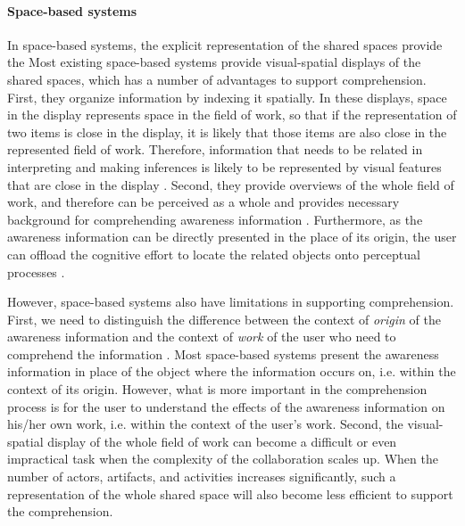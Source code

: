 \paragraph*{Space-based systems} %
\label{par:space_based_systems}
In space-based systems, the explicit representation of the shared spaces provide the Most existing space-based systems provide visual-spatial displays \cite{Hegarty2011} of the shared spaces, which has a number of advantages to support comprehension. First, they organize information by indexing it spatially. In these displays, space in the display represents space in the field of work, so that if the representation of two items is close in the display, it is likely that those items are also close in the represented field of work. Therefore, information that needs to be related in interpreting and making inferences is likely to be represented by visual features that are close in the display \cite{Hegarty2011}. Second, they provide overviews of the whole field of work, and therefore can be perceived as a whole and provides necessary background for comprehending awareness information \cite{Berlage1999}. Furthermore, as the awareness information can be directly presented in the place of its origin, the user can offload the cognitive effort to locate the related objects onto perceptual processes \cite{M.1996}.

However, space-based systems also have limitations in supporting comprehension. First, we need to distinguish the difference between the context of \emph{origin} of the awareness information and the context of \emph{work} of the user who need to comprehend the information \cite{Gross2004}. Most space-based systems present the awareness information in place of the object where the information occurs on, i.e. within the context of its origin. However, what is more important in the comprehension process is for the user to understand the effects of the awareness information on his/her own work, i.e. within the context of the user's work. Second, the visual-spatial display of the whole field of work can become a difficult or even impractical task when the complexity of the collaboration scales up. When the number of actors, artifacts, and activities increases significantly, such a representation of the whole shared space will also become less efficient to support the comprehension. 

